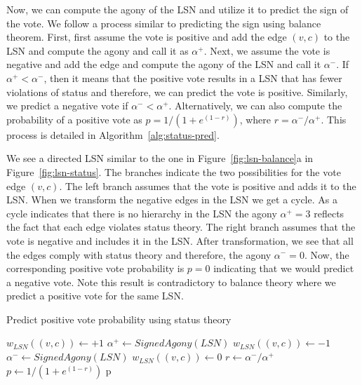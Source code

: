 Now, we can compute the agony of the LSN and utilize it to predict the sign of the vote.
We follow a process similar to predicting the sign using balance theorem.
First, first assume the vote is positive and add the edge $(v,c)$ to the LSN and compute the agony and call it as $\alpha^+$.
Next, we assume the vote is negative and add the edge and compute the agony of the LSN and call it $\alpha^-$.
If $\alpha^+ < \alpha^-$, then it means that the positive vote results in a LSN that has fewer violations of status and therefore, we can predict the vote is positive.
Similarly, we predict a negative vote if $\alpha^- < \alpha^+$.
Alternatively, we can also compute the probability of a positive vote as $p=1/(1+e^{(1-r)})$, where $r=\alpha^-/\alpha^+$.
This process is detailed in Algorithm~\ref{alg:status-pred}.

We see a directed LSN similar to the one in Figure~\ref{fig:lsn-balance}a in Figure~\ref{fig:lsn-status}.
The branches indicate the two possibilities for the vote edge $(v,c)$.
The left branch assumes that the vote is positive and adds it to the LSN.
When we transform the negative edges in the LSN we get a cycle.
As a cycle indicates that there is no hierarchy in the LSN the agony $\alpha^+=3$ reflects the fact that each edge violates status theory.
The right branch assumes that the vote is negative and includes it in the LSN.
After transformation, we see that all the edges comply with status theory and therefore, the agony $\alpha^-=0$.
Now, the corresponding positive vote probability is $p=0$ indicating that we would predict a negative vote.
Note this result is contradictory to balance theory where we predict a positive vote for the same LSN.

\begin{algorithm}[htp]
    \DontPrintSemicolon
    \caption{Predict positive vote probability using status theory}
    \label{alg:status-pred}
    $w_{LSN}((v,c)) \leftarrow +1$ 
    $\alpha^+ \leftarrow SignedAgony(LSN)$\;
    $w_{LSN}((v,c)) \leftarrow -1$  
    $\alpha^- \leftarrow SignedAgony(LSN)$\;
    $w_{LSN}((v,c)) \leftarrow 0$ 
    $r \leftarrow {\alpha^-}/{\alpha^{+}}$\;
    $p \leftarrow 1/(1+e^{(1-r)})$\;
    \Return p
\end{algorithm}




